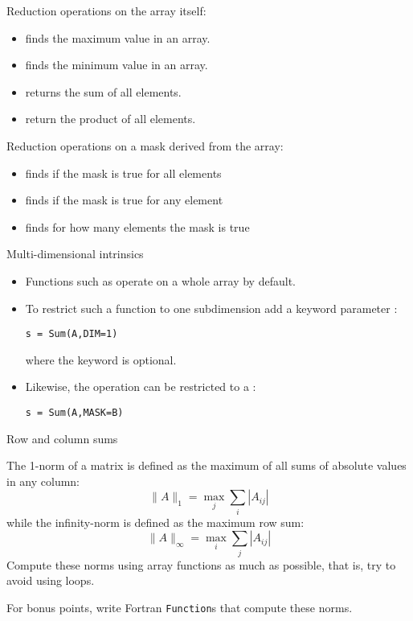 Reduction operations on the array itself:
\begin{itemize}
  \item {} finds the maximum value in an array.
  \item {} finds the minimum value in an array.
  \item {} returns the sum of all elements.
  \item {} return the product of all elements.
\end{itemize}

Reduction operations on a mask derived from the array:
\begin{itemize}
\item {} finds if the mask is true for all elements
\item {} finds if the mask is true for any element
\item {} finds for how many elements the mask is true
\end{itemize}

\begin{block}{Multi-dimensional intrinsics}
  \label{sl:array-funcfmd}
  \begin{itemize}
  \item
    Functions such as  operate on a whole array by
    default.
  \item To
    restrict such a function to one subdimension add a keyword
    parameter :
\begin{lstlisting}
s = Sum(A,DIM=1)
\end{lstlisting}
where the keyword is optional.
\item Likewise, the operation can be restricted to a :
\begin{lstlisting}
s = Sum(A,MASK=B)
\end{lstlisting}
  \end{itemize}
\end{block}

\begin{block}{Row and column sums}
  \label{sl:farray-row-col-sum}
\end{block}

\begin{exercise}
  \label{ex:fmatnorm}
  The 1-norm of a matrix is defined as the maximum of all sums of absolute
  values in any column:
  \[ \|A\|_1 = \max_j \sum_i |A_{ij}| \]
  while the infinity-norm is defined as the maximum row sum:
  \[ \|A\|_\infty = \max_i \sum_j |A_{ij}| \]
  Compute these norms using array functions as much as possible, that
  is, try to avoid using loops.
  
  For bonus points, write Fortran \lstinline{Function}s that compute
  these norms.
\end{exercise}

